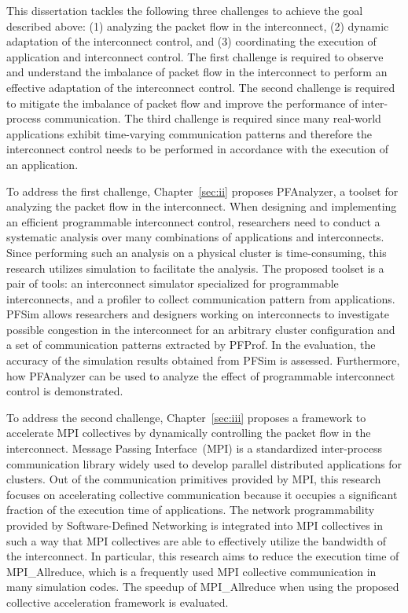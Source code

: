 This dissertation tackles the following three challenges to achieve the goal
described above: (1) analyzing the packet flow in the interconnect, (2)
dynamic adaptation of the interconnect control, and (3) coordinating the
execution of application and interconnect control. The first challenge is
required to observe and understand the imbalance of packet flow in the
interconnect to perform an effective adaptation of the interconnect control.
The second challenge is required to mitigate the imbalance of packet flow and
improve the performance of inter-process communication. The third challenge is
required since many real-world applications exhibit time-varying communication
patterns and therefore the interconnect control needs to be performed in
accordance with the execution of an application.

To address the first challenge, Chapter~\ref{sec:ii} proposes PFAnalyzer, a
toolset for analyzing the packet flow in the interconnect. When designing and
implementing an efficient programmable interconnect control, researchers need
to conduct a systematic analysis over many combinations of applications and
interconnects. Since performing such an analysis on a physical cluster is
time-consuming, this research utilizes simulation to facilitate the analysis.
The proposed toolset is a pair of tools: an interconnect simulator
specialized for programmable interconnects, and a profiler to collect
communication pattern from applications. PFSim allows researchers and
designers working on interconnects to investigate possible congestion in the
interconnect for an arbitrary cluster configuration and a set of communication
patterns extracted by PFProf. In the evaluation, the accuracy of the
simulation results obtained from PFSim is assessed. Furthermore, how
PFAnalyzer can be used to analyze the effect of programmable interconnect
control is demonstrated.

To address the second challenge, Chapter~\ref{sec:iii} proposes a framework to
accelerate MPI collectives by dynamically controlling the packet flow in the
interconnect. Message Passing Interface~(MPI) is a standardized inter-process
communication library widely used to develop parallel distributed
applications for clusters. Out of the communication primitives provided by
MPI, this research focuses on accelerating collective communication because it
occupies a significant fraction of the execution time of applications. The
network programmability provided by Software-Defined Networking is integrated
into MPI collectives in such a way that MPI collectives are able to
effectively utilize the bandwidth of the interconnect. In particular, this
research aims to reduce the execution time of MPI\_Allreduce, which is a
frequently used MPI collective communication in many simulation codes. The
speedup of MPI\_Allreduce when using the proposed collective acceleration
framework is evaluated.


